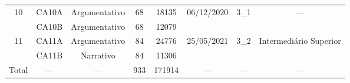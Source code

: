 \documentclass[portuguese]{textolivre}
\begin{document}
\begin{table}[h]
\begin{threeparttable}
\begin{tabular}{cccccccc}
\multirow{2}{*}{10} & CA10A                                                             & Argumentativo                                               & 68                                                            & 18135                                                           & \multirow{2}{*}{06/12/2020}                                  & \multirow{2}{*}{3\_1}                                                                     & \multirow{2}{*}{---}                                                          \\
                    & CA10B                                                             & Argumentativo                                               & 68                                                            & 12079                                                           &                                                              &                                                                                           &                                                                               \\ 
\multirow{2}{*}{11} & CA11A                                                             & Argumentativo                                               & 84                                                            & 24776                                                           & \multirow{2}{*}{25/05/2021}                                  & \multirow{2}{*}{3\_2}                                                                     & \multirow{2}{*}{\parbox[t]{1.4cm}{Intermediário Superior}}                                       \\
                    & CA11B                                                             & Narrativo                                                   & 84                                                            & 11306                                                           &                                                              &                                                                                           &                                                                               \\ 
Total               & ---                                                               & ---                                                         & 933                                                           & 171914                                                          & ---                                                          & ---                                                                                       & ---                                                                           \\ 
\bottomrule
\end{tabular}
\end{threeparttable}
\end{table}
\end{document}
